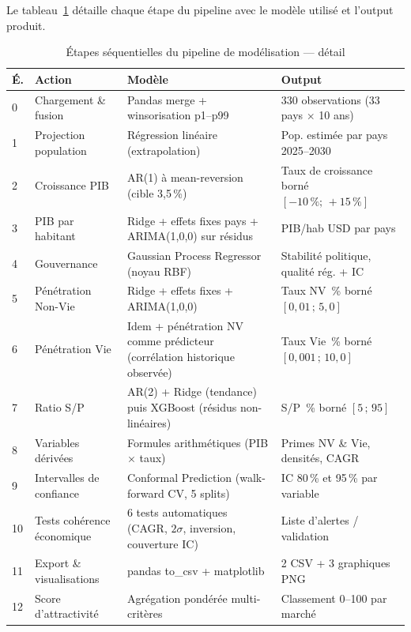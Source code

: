 \documentclass[12pt,a4paper]{report}
\begin{document}
Le tableau~\ref{tab:pipeline_steps} détaille chaque étape du pipeline avec le modèle utilisé et l'output produit.

\begin{table}[H]
\centering
\caption{Étapes séquentielles du pipeline de modélisation --- détail}
\label{tab:pipeline_steps}
\small
\renewcommand{\arraystretch}{1.25}
\begin{tabularx}{\textwidth}{@{}p{0.5cm}p{3.5cm}p{4cm}X@{}}
\toprule
\textbf{É.} & \textbf{Action} & \textbf{Modèle} & \textbf{Output} \\
\midrule
0 & Chargement \& fusion & Pandas merge + winsorisation p1--p99 & 330 observations (33 pays $\times$ 10 ans) \\
1 & Projection population & Régression linéaire (extrapolation) & Pop. estimée par pays 2025--2030 \\
2 & Croissance PIB & AR(1) à mean-reversion (cible 3,5\,\%) & Taux de croissance borné $[-10\,\%;\,+15\,\%]$ \\
3 & PIB par habitant & Ridge + effets fixes pays + ARIMA(1,0,0) sur résidus & PIB/hab USD par pays \\
4 & Gouvernance & Gaussian Process Regressor (noyau RBF) & Stabilité politique, qualité rég. + IC \\
5 & Pénétration Non-Vie & Ridge + effets fixes + ARIMA(1,0,0) & Taux NV \,\% borné $[0{,}01\,;\,5{,}0]$ \\
6 & Pénétration Vie & Idem + pénétration NV comme prédicteur (corrélation historique observée) & Taux Vie \,\% borné $[0{,}001\,;\,10{,}0]$ \\
7 & Ratio S/P & AR(2) + Ridge (tendance) puis XGBoost (résidus non-linéaires) & S/P \,\% borné $[5\,;\,95]$ \\
8 & Variables dérivées & Formules arithmétiques (PIB $\times$ taux) & Primes NV \& Vie, densités, CAGR \\
9 & Intervalles de confiance & Conformal Prediction (walk-forward CV, 5 splits) & IC 80\,\% et 95\,\% par variable \\
10 & Tests cohérence économique & 6 tests automatiques (CAGR, $2\sigma$, inversion, couverture IC) & Liste d'alertes / validation \\
11 & Export \& visualisations & pandas to\_csv + matplotlib & 2 CSV + 3 graphiques PNG \\
12 & Score d'attractivité & Agrégation pondérée multi-critères & Classement 0--100 par marché \\
\bottomrule
\end{tabularx}
\end{table}
\end{document}
